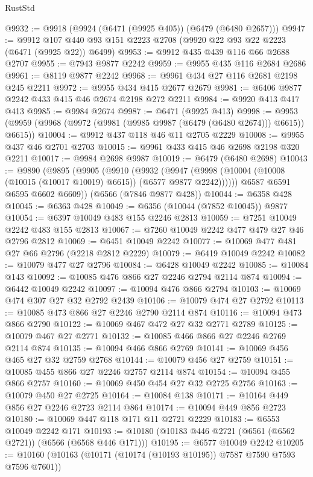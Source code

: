 \begin{lexlean}{RustStd}
\begin{coremodule}
@9932 := @9918 (@9924 (@6471 (@9925 @405)) (@6479 (@6480 @2657)))
@9947 := @9912 @107 @440 @93 @151 @2223 @2708 (@9920 @22 @93 @22 @2223 (@6471 (@9925 @22)) @6499)
@9953 := @9912 @435 @439 @116 @66 @2688 @2707
@9955 := @7943 @9877 @2242
@9959 := @9955 @435 @116 @2684 @2686
@9961 := @8119 @9877 @2242
@9968 := @9961 @434 @27 @116 @2681 @2198 @245 @2211
@9972 := @9955 @434 @415 @2677 @2679
@9981 := @6406 @9877 @2242 @433 @415 @46 @2674 @2198 @272 @2211
@9984 := @9920 @413 @417 @413
@9985 := @9984 @2674
@9987 := @6471 (@9925 @413)
@9998 := @9953 (@9959 (@9968 (@9972 (@9981 (@9985 @9987 (@6479 (@6480 @2674))) @6615)) @6615))
@10004 := @9912 @437 @118 @46 @11 @2705 @2229
@10008 := @9955 @437 @46 @2701 @2703
@10015 := @9961 @433 @415 @46 @2698 @2198 @320 @2211
@10017 := @9984 @2698 @9987
@10019 := @6479 (@6480 @2698)
@10043 := @9890
    (@9895
      (@9905
        (@9910
          (@9932
            (@9947 (@9998 (@10004 (@10008 (@10015 (@10017 @10019) @6615)) (@6577 @9877 @2242))))))
        @6587
        @6591
        @6595
        @6602
        @6609))
    (@6566 (@7846 @9877 @428))
@10044 := @6358 @428
@10045 := @6363 @428
@10049 := @6356 (@10044 (@7852 @10045)) @9877
@10054 := @6397 @10049 @483 @155 @2246 @2813
@10059 := @7251 @10049 @2242 @483 @155 @2813
@10067 := @7260 @10049 @2242 @477 @479 @27 @46 @2796 @2812
@10069 := @6451 @10049 @2242
@10077 := @10069 @477 @481 @27 @66 @2796 (@2218 @2812 @2229)
@10079 := @6419 @10049 @2242
@10082 := @10079 @477 @27 @2796
@10084 := @6428 @10049 @2242
@10085 := @10084 @143
@10092 := @10085 @476 @866 @27 @2246 @2794 @2114 @874
@10094 := @6442 @10049 @2242
@10097 := @10094 @476 @866 @2794
@10103 := @10069 @474 @307 @27 @32 @2792 @2439
@10106 := @10079 @474 @27 @2792
@10113 := @10085 @473 @866 @27 @2246 @2790 @2114 @874
@10116 := @10094 @473 @866 @2790
@10122 := @10069 @467 @472 @27 @32 @2771 @2789
@10125 := @10079 @467 @27 @2771
@10132 := @10085 @466 @866 @27 @2246 @2769 @2114 @874
@10135 := @10094 @466 @866 @2769
@10141 := @10069 @456 @465 @27 @32 @2759 @2768
@10144 := @10079 @456 @27 @2759
@10151 := @10085 @455 @866 @27 @2246 @2757 @2114 @874
@10154 := @10094 @455 @866 @2757
@10160 := @10069 @450 @454 @27 @32 @2725 @2756
@10163 := @10079 @450 @27 @2725
@10164 := @10084 @138
@10171 := @10164 @449 @856 @27 @2246 @2723 @2114 @864
@10174 := @10094 @449 @856 @2723
@10180 := @10069 @447 @118 @171 @11 @2721 @2229
@10183 := @6553 @10049 @2242 @171
@10193 := @10180 (@10183 @446 @2721 (@6561 (@6562 @2721)) (@6566 (@6568 @446 @171)))
@10195 := @6577 @10049 @2242
@10205 := @10160 (@10163 (@10171 (@10174 (@10193 @10195)) @7587 @7590 @7593 @7596 @7601))

\end{coremodule}
\end{lexlean}
